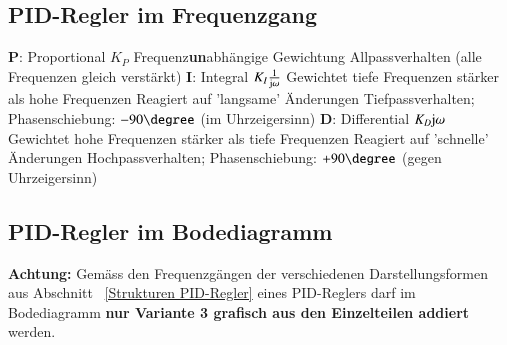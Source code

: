 \subsection{PID-Regler im Frequenzgang}

\begin{outline}
    \1 \textbf{P}: Proportional $K_P$
        \2 Frequenz\textbf{un}abhängige Gewichtung
        \2 Allpassverhalten (alle Frequenzen gleich verstärkt)
    \1 \textbf{I}: Integral $K_I \frac{1}{\mathrm{j} \omega}$
        \2 Gewichtet tiefe Frequenzen stärker als hohe Frequenzen
        \2 Reagiert auf 'langsame' Änderungen 
        \2 Tiefpassverhalten; Phasenschiebung: $-90 \degree$ (im Uhrzeigersinn)
    \1 \textbf{D}: Differential $K_D \mathrm{j} \omega$
        \2 Gewichtet hohe Frequenzen stärker als tiefe Frequenzen
        \2 Reagiert auf 'schnelle' Änderungen 
        \2 Hochpassverhalten; Phasenschiebung: $+90 \degree$ (gegen Uhrzeigersinn)
\end{outline}


\subsection{PID-Regler im Bodediagramm}

\textbf{Achtung:} Gemäss den Frequenzgängen der verschiedenen Darstellungsformen aus Abschnitt ~\ref{Strukturen PID-Regler} 
eines PID-Reglers darf im Bodediagramm \textbf{nur Variante 3 grafisch aus den Einzelteilen addiert} werden. 

